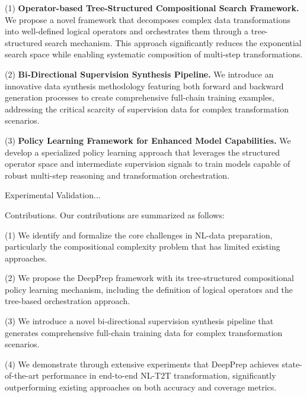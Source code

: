 

(1) \textbf{Operator-based Tree-Structured Compositional Search Framework.} We propose a novel framework that decomposes complex data transformations into well-defined logical operators and orchestrates them through a tree-structured search mechanism. This approach significantly reduces the exponential search space while enabling systematic composition of multi-step transformations.

(2) \textbf{Bi-Directional Supervision Synthesis Pipeline.} We introduce an innovative data synthesis methodology featuring both forward and backward generation processes to create comprehensive full-chain training examples, addressing the critical scarcity of supervision data for complex transformation scenarios.

(3) \textbf{Policy Learning Framework for Enhanced Model Capabilities.} We develop a specialized policy learning approach that leverages the structured operator space and intermediate supervision signals to train models capable of robust multi-step reasoning and transformation orchestration.

Experimental Validation...

Contributions. Our contributions are summarized as follows:

(1) We identify and formalize the core challenges in NL-\nlwhat data preparation, particularly the compositional complexity problem that has limited existing approaches.

(2) We propose the DeepPrep framework with its tree-structured compositional policy learning mechanism, including the definition of logical operators and the tree-based orchestration approach.

(3) We introduce a novel bi-directional supervision synthesis pipeline that generates comprehensive full-chain training data for complex transformation scenarios.

(4) We demonstrate through extensive experiments that DeepPrep achieves state-of-the-art performance in end-to-end NL-\nlwhat T2T transformation, significantly outperforming existing approaches on both accuracy and coverage metrics.